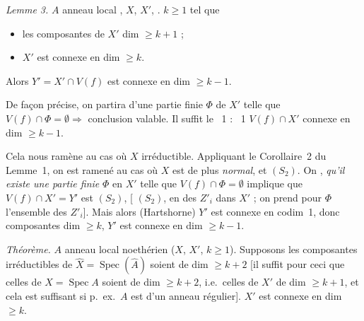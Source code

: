 \documentclass[11pt,a4paper]{article}
\begin{document}
\emph{Lemme 3.} $A$ anneau local  \struck{\ill{}} ,  \struck{\ill{}} $X$, $X'$, . \ill{} $k \geq 1$ tel que
\begin{itemize}
  \item[(i)] les composantes de $X'$ \ill{} dim $\geq k+1$ ;
  \item[(ii)] $X'$ est connexe en dim $\geq k$.
\end{itemize}

Alors  $Y' = X' \cap V(f)$  est connexe en dim $\geq k-1$.

De façon précise, on partira d'une partie finie $\Phi$ de $X'$ telle que $V(f) \cap \Phi = \emptyset \Longrightarrow$ conclusion valable.
Il suffit \ill{} le ~1 : ~1 \ill{} $V(f) \cap X'$  connexe en dim $\geq k-1$.

Cela nous ramène au cas où $X$ irréductible. Appliquant le Corollaire~2 du Lemme~1, on est ramené au cas où $X$ est de plus \emph{normal}, et  $(S_2)$. On \ill{} \ill{} \ill{}, \ill{} \ill{} \emph{qu'il existe une partie finie} $\Phi$ en $X'$ telle que $V(f) \cap \Phi = \emptyset$ implique que $V(f) \cap X' = Y'$ est $(S_2)$, [\ill{} \ill{} \ill{} $(S_2)$, en  \ill{} des $Z'_i$ dans $X'$ ; on prend pour $\Phi$ l'ensemble des \ill{} \ill{} \ill{} \struck{\ill{}} $Z'_i$]. Mais alors (Hartshorne) $Y'$ est connexe en codim~1, donc \ill{} \ill{}  composantes  \ill{} dim $\geq k$, $Y'$ est connexe en dim $\geq k-1$.

\emph{Théorème.} $A$ anneau local noethérien ($X$, $X'$, $k \geq 1$). Supposons  \struck{\ill{} \ill{}} les composantes irréductibles de $\hat{X} = \operatorname{Spec}(\hat{A})$ soient de dim $\geq k+2$ [il suffit pour ceci que celles de $X = \operatorname{Spec} A$ soient de dim $\geq k+2$, i.e.\ celles de $X'$ de dim $\geq k+1$, et cela est suffisant si p.~ex.\ $A$ est  d'un anneau régulier].  \ill{} $X'$ est connexe en dim $\geq k$.
\end{document}
